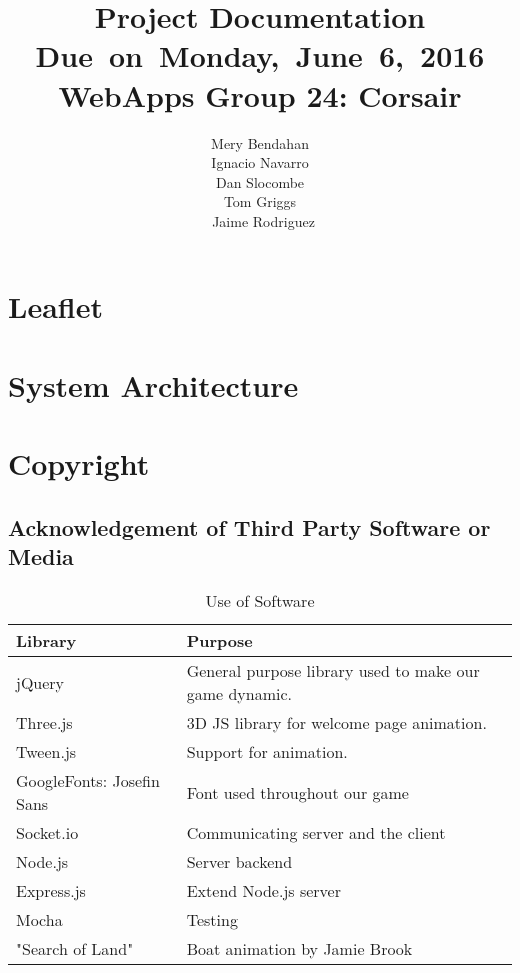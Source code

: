 \documentclass{article}
\title{
\vspace{2in}
\textmd{\textbf{Project Documentation}}\\
\normalsize\vspace{0.1in}\small{Due\ on\ Monday,\ June\ 6,\ 2016}\\
\vspace{0.1in}\large{\textbf{WebApps Group 24: Corsair}}
\vspace{3in}
}
\author{Mery Bendahan \\ Ignacio Navarro \\ Dan Slocombe \\ Tom Griggs \\ Jaime Rodriguez}
\date{}
\renewcommand{\_}{\char`_}
\begin{document}
\maketitle
\newpage


\section{Leaflet}

\section{System Architecture}

\section{Copyright}

\subsection{Acknowledgement of Third Party Software or Media}

\begin{table}[H]
\centering
\caption{Use of Software}
\label{my-label}
\begin{tabular}{|l|l|}
\hline
\textbf{Library}         & \textbf{Purpose}                                        \\ \hline
jQuery                    & General purpose library used to make our game dynamic. \\ \hline
Three.js                  & 3D JS library for welcome page animation.              \\ \hline
Tween.js                  & Support for animation.                                 \\ \hline
GoogleFonts: Josefin Sans & Font used throughout our game                          \\ \hline
Socket.io                 & Communicating server and the client                    \\ \hline
Node.js                   & Server backend                                         \\ \hline
Express.js                & Extend Node.js server                                  \\ \hline
Mocha                     & Testing                                                \\ \hline
"Search of Land"          & Boat animation by Jamie Brook                               \\ \hline
\end{tabular}
\end{table}
\end{document}
